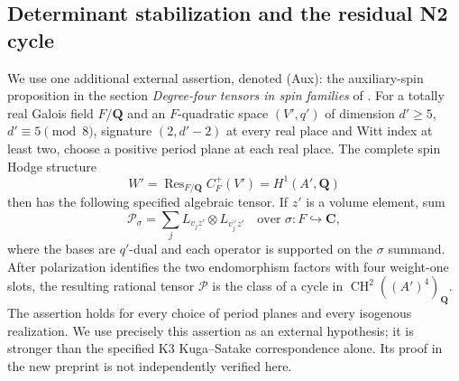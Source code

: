 \documentclass[11pt,reqno]{article}
\theoremstyle{emphasizedplain}
\theoremstyle{emphasizeddefinition}
\theoremstyle{emphasizeddefinition}
\DeclareMathOperator{\Res}{Res}
\DeclareMathOperator{\CH}{CH}
\newcommand{\Q}{\mathbf Q}
\newcommand{\C}{\mathbf C}
\begin{document}
\subsection*{Determinant stabilization and the residual N2 cycle}
We use one additional external assertion, denoted (Aux):
the auxiliary-spin proposition in the section
\emph{Degree-four tensors in spin families} of \cite{OpenAIK3Products}.
For a totally real Galois field $F/\Q$ and an $F$-quadratic space
$(V',q')$ of dimension $d'\geq5$, $d'\equiv5\pmod8$, signature
$(2,d'-2)$ at every real place and Witt index at least two,
choose a positive period plane at each real place. The complete
spin Hodge structure
\[
 W'=\Res_{F/\Q}C_F^+(V')=H^1(A',\Q)
\]
then has the following specified algebraic tensor. If $z'$ is a
volume element, sum
\[
 \mathcal P_\sigma=\sum_jL_{v_jz'}\otimes L_{v_j^\vee z'}
 \quad\text{over }\sigma:F\hookrightarrow\C,
                                                        \tag{N2.1}
\]
where the bases are $q'$-dual and each operator is supported on
the $\sigma$ summand. After polarization identifies the two
endomorphism factors with four weight-one slots, the resulting
rational tensor $\mathcal P$ is the class of a cycle in
$\CH^2((A')^4)_\Q$. The assertion holds for every choice of period
planes and every isogenous realization. We use precisely this
assertion as an external hypothesis; it is stronger than the
specified K3 Kuga--Satake correspondence alone. Its proof in the
new preprint is not independently verified here.
\end{document}
